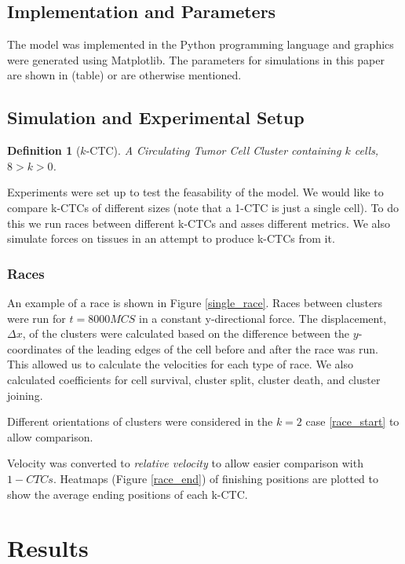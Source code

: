 \documentclass[12pt]{article}
\newtheorem{definition}{Definition}
\begin{document}
\subsection{Implementation and Parameters}
The model was implemented in the Python programming language and graphics were generated using Matplotlib\cite{matplotlib}. The parameters for simulations in this paper are shown in (table) or are otherwise mentioned. %

\subsection{Simulation and Experimental Setup}
\begin{definition}[$k$-CTC]
A Circulating Tumor Cell Cluster containing $k$ cells, $8>k>0$.
\end{definition}

Experiments were set up to test the feasability of the model. We would like to compare k-CTCs of different sizes (note that a 1-CTC is just a single cell). To do this we run races between different k-CTCs and asses different metrics. We also simulate forces on tissues in an attempt to produce k-CTCs from it.

\subsubsection{Races}
An example of a race is shown in  Figure \ref{single_race}. Races between clusters were run for $t=8000MCS$ in a constant y-directional force. The displacement, $\Delta x$, of the clusters were calculated based on the difference between the $y$-coordinates of the leading edges of the cell before and after the race was run. This allowed us to calculate the velocities for each type of race. We also calculated coefficients for cell survival, cluster split, cluster death, and cluster joining. 

Different orientations of clusters were considered in the $k=2$ case \ref{race_start} to allow comparison.

Velocity was converted to \emph{relative velocity} to allow easier comparison with $1-CTCs$. Heatmaps (Figure \ref{race_end}) of finishing positions are plotted to show the average ending positions of each k-CTC.


\section{Results}
\end{document}
